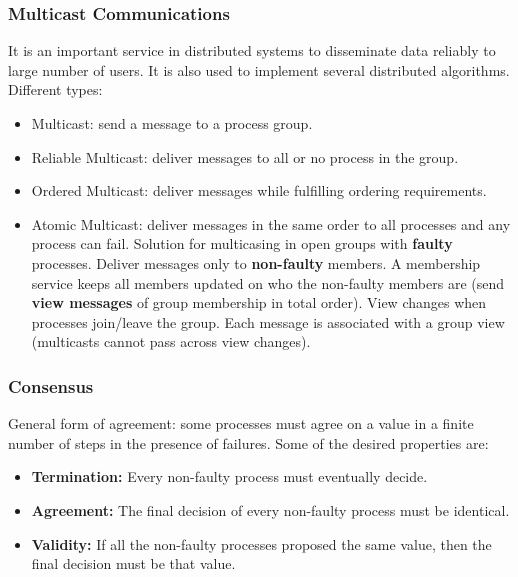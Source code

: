 \subsubsection*{Multicast Communications}

It is an important service in distributed systems to disseminate data reliably to large number of users.
It is also used to implement several distributed algorithms.
Different types:
\begin{itemize}
    \item Multicast: send a message to a process group.
    \item Reliable Multicast: deliver messages to all or no process in the group.
    \item Ordered Multicast: deliver messages while fulfilling ordering requirements.
    \item Atomic Multicast: deliver messages in the same order to all processes and any process can fail.
        Solution for multicasing in open groups with \textbf{faulty} processes.
        Deliver messages only to \textbf{non-faulty} members.
        A membership service keeps all members updated on who the non-faulty members are (send \textbf{view messages} of group membership in total order).
        View changes when processes join/leave the group.
        Each message is associated with a group view (multicasts cannot pass across view changes).

\end{itemize}
\subsubsection*{Consensus}

General form of agreement: some processes must agree on a value in a finite number of steps in the presence of failures.
Some of the desired properties are:
\begin{itemize}
    \item \textbf{Termination:} Every non-faulty process must eventually decide.
    \item \textbf{Agreement:} The final decision of every non-faulty process must be identical.
    \item \textbf{Validity:} If all the non-faulty processes proposed the same value, then the final decision must be that value.
\end{itemize}

